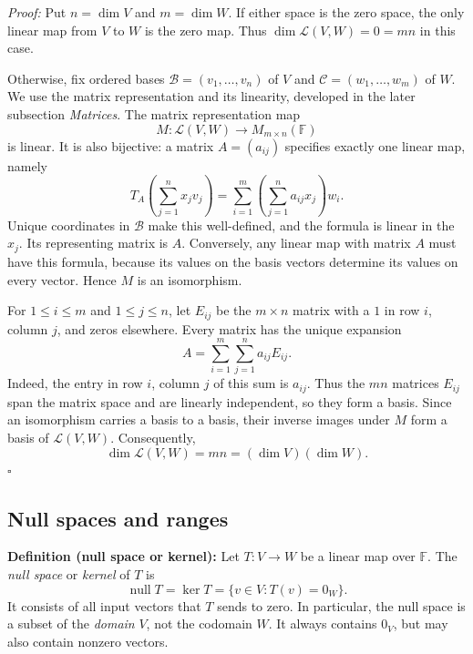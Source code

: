 \documentclass[a4paper,11pt,abstract=true]{scrartcl}
\theoremstyle{dotlessP}
\theoremstyle{dotlessS}
\theoremstyle{remark}
\theoremstyle{definition}
\begin{document}
\begin{claim_box}
\textit{Proof:} Put $n=\dim V$ and $m=\dim W$. If either space is
the zero space, the only linear map from $V$ to $W$ is the zero map.
Thus $\dim\mathcal{L}(V,W)=0=mn$ in this case.

Otherwise, fix ordered bases $\mathcal{B}=(v_1,\ldots,v_n)$ of $V$
and $\mathcal{C}=(w_1,\ldots,w_m)$ of $W$. We use the matrix
representation and its linearity, developed in the later subsection
\emph{Matrices}. The matrix representation map
\[
M:\mathcal{L}(V,W)\longrightarrow M_{m\times n}(\mathbb{F})
\]
is linear. It is also bijective: a matrix $A=(a_{ij})$ specifies
exactly one linear map, namely
\[
T_A\left(\sum_{j=1}^n x_j v_j\right)
=\sum_{i=1}^m\left(\sum_{j=1}^n a_{ij}x_j\right)w_i.
\]
Unique coordinates in $\mathcal{B}$ make this well-defined, and the
formula is linear in the $x_j$. Its representing matrix is $A$.
Conversely, any linear map with matrix $A$ must have this formula,
because its values on the basis vectors determine its values on every
vector. Hence $M$ is an isomorphism.

For $1\leq i\leq m$ and $1\leq j\leq n$, let $E_{ij}$ be the
$m\times n$ matrix with a $1$ in row $i$, column $j$, and zeros
elsewhere. Every matrix has the unique expansion
\[
A=\sum_{i=1}^m\sum_{j=1}^n a_{ij}E_{ij}.
\]
Indeed, the entry in row $i$, column $j$ of this sum is $a_{ij}$.
Thus the $mn$ matrices $E_{ij}$ span the matrix space and are linearly
independent, so they form a basis. Since an isomorphism carries a basis
to a basis, their inverse images under $M$ form a basis of
$\mathcal{L}(V,W)$. Consequently,
\[
\dim\mathcal{L}(V,W)=mn=(\dim V)(\dim W).
\]
\hfill$\square$
\end{claim_box}

\subsection{Null spaces and ranges}

\begin{definition_box}
\textbf{Definition (null space or kernel):} Let
$T:V\longrightarrow W$ be a linear map over $\mathbb{F}$. The
\emph{null space} or \emph{kernel} of $T$ is
\[
\operatorname{null}T=\ker T=\{v\in V:T(v)=0_W\}.
\]
It consists of all input vectors that $T$ sends to zero. In particular,
the null space is a subset of the \emph{domain} $V$, not the codomain $W$.
It always contains $0_V$, but may also contain nonzero vectors.
\end{definition_box}
\end{document}
